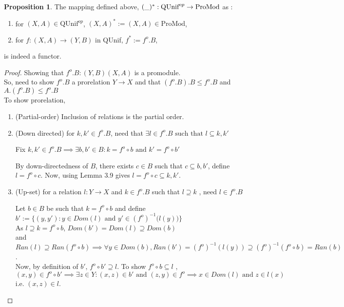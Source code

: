 \documentclass[a4paper]{article}
\makeatletter
\theoremstyle{definition}
\newtheorem{prop}[theorem]{Proposition}
\newcommand{\carrow}{}%
\DeclareRobustCommand{\carrow}{%
	\mathrel{\vphantom{\rightarrow}\mathpalette\circle@arrow\relax}%
}
\newcommand{\circle@arrow}[2]{%
	\m@th
	\ooalign{%
		\hidewidth$#1\circ\mkern1mu$\hidewidth\cr
	$#1\longrightarrow$\cr}%
}
\makeatother
\begin{document}
			\begin{prop} The mapping defined above, $(\string _)^*:\text{QUnif}^{op} \to \text{ProMod}$ as :
				\begin{enumerate}[label=(\alph*)]
					\item for $(X,A) \in \text{QUnif}^{op}$, $(X,A)^*:=(X,A) \in \text{ProMod}$,
					\item for $f:(X,A) \to (Y,B)$ in QUnif,
						$f^* := f^o .B$,
				\end{enumerate}
				is indeed a functor.
			\end{prop}
			\begin{proof}\setcounter{equation}{0}

				Showing that $f^o .B: (Y,B) \carrow (X,A)$ is a promodule.\\
				So, need to show $f^o .B$ a prorelation $Y \to X$
				and that $(f^o .B).B \leq f^o .B$ and $A.(f^o .B) \leq f^o .B$ \\
				To show prorelation, \begin{enumerate}[label=(\roman*)]
					\item (Partial-order) Inclusion of relations is the
						partial order.
					\item (Down directed) for $k,k' \in f^o .B$, need that $\exists l \in f^o .B
						\text{ such that } l \subseteq k,k'$

						Fix $k,k' \in f^o .B \implies \exists b,b' \in B : k=f^o \circ b \text{ and }
						k' = f^o \circ b'$

						By down-directedness of $B$, there exists $c \in B$ such that
						$ c \subseteq b,b'$, define $l=f^o \circ c$.
						Now, using Lemma 3.9 gives  $l= f^o \circ c \subseteq k,k'$.
					\item (Up-set) for a relation $l:Y \to X$ and $k \in f^o .B$ such that $l \supseteq k$
						, need $l \in f^o .B$

						Let $b\in B$ be such that $k=f^o \circ b$ and define
						$b':=\{(y,y'): y \in Dom(l) \text{ and } y' \in (f^o)^{-1}\big(l(y))\}$\\
						As $l\supseteq k=f^o \circ b$, $Dom(b')=Dom(l)\supseteq Dom(b)$
						\\ and $Ran(l) \supseteq Ran(f^o \circ b)\implies
						\forall y \in Dom(b), Ran(b')=(f^o )^{-1}(l(y)) \supseteq (f^o)^{-1}(f^o \circ b ) = Ran(b)$.\\
						Now, by definition of $b'$, $f^o \circ b' \supseteq l$. To show
						$f^o \circ b \subseteq l$ , \\
						$(x,y)\in f^o \circ b' \implies \exists z \in Y: (x,z)\in b' \text{ and }
						(z,y) \in f^o \implies x \in Dom(l) \text{ and } z \in l(x)$ i.e.
						$(x,z) \in l$.


\end{enumerate}
\end{proof}
\end{document}
